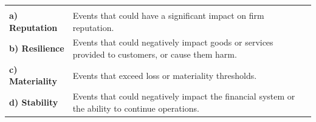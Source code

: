 \noindent\begin{minipage}{\textwidth}
\renewcommand{\arraystretch}{1.35}
\begin{tabularx}{\textwidth}{@{}L{0.22\textwidth}Y@{}}
  & \\
{\tabfont \textbf{a) Reputation}} & {\tabfont Events that could have a significant impact on firm reputation.}\\
{\tabfont \textbf{b) Resilience}} & {\tabfont Events that could negatively impact goods or services provided to customers, or cause them harm.}\\
{\tabfont \textbf{c) Materiality}} & {\tabfont Events that exceed loss or materiality thresholds.}\\
{\tabfont \textbf{d) Stability}} & {\tabfont Events that could negatively impact the financial system or the ability to continue operations.}\\
\end{tabularx}
\end{minipage}
